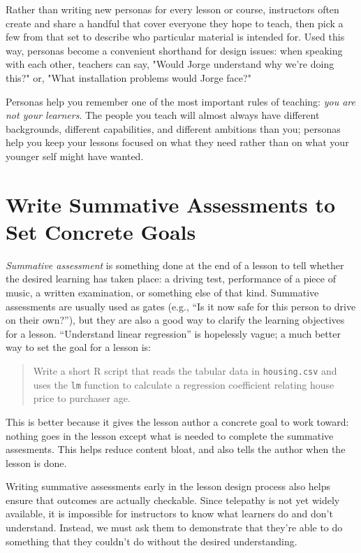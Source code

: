 \documentclass[10pt,letterpaper]{article}
\newcommand{\rulemajor}[1]{\section{#1}}
\begin{document}
Rather than writing new personas for every lesson or course, instructors often
create and share a handful that cover everyone they hope to teach, then pick a
few from that set to describe who particular material is intended for.  Used
this way, personas become a convenient shorthand for design issues: when
speaking with each other, teachers can say, "Would Jorge understand why we're
doing this?" or, "What installation problems would Jorge face?"

Personas help you remember one of the most important rules of teaching:
\emph{you are not your learners}.  The people you teach will almost always have
different backgrounds, different capabilities, and different ambitions than you;
personas help you keep your lessons focused on what they need rather than on
what your younger self might have wanted.

\rulemajor{Write Summative Assessments to Set Concrete Goals}

\emph{Summative assessment} is something done at the end of a lesson to tell
whether the desired learning has taken place: a driving test, performance of a
piece of music, a written examination, or something else of that kind.
Summative assessments are usually used as gates (e.g., ``Is it now safe for this
person to drive on their own?''), but they are also a good way to clarify the
learning objectives for a lesson.  ``Understand linear regression'' is
hopelessly vague; a much better way to set the goal for a lesson is:

\begin{quotation}

  Write a short R script that reads the tabular data in \texttt{housing.csv}
  and uses the \texttt{lm} function to calculate a regression coefficient
  relating house price to purchaser age.

\end{quotation}

This is better because it gives the lesson author a concrete goal to work
toward: nothing goes in the lesson except what is needed to complete the
summative assesments.  This helps reduce content bloat, and also tells the
author when the lesson is done.

Writing summative assessments early in the lesson design process also helps
ensure that outcomes are actually checkable.  Since telepathy is not yet widely
available, it is impossible for instructors to know what learners do and don't
understand.  Instead, we must ask them to demonstrate that they're able to do
something that they couldn't do without the desired understanding.
\end{document}
